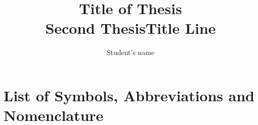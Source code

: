 \documentclass{ucalgthes1}
\title{Title of Thesis \\ \bigskip Second ThesisTitle Line }
\author{Student's name}
\begin{document}


\makethesistitle
{}     %
\setcounter{page}{1}

\newpage
{}
{}

\newpage
{}
{}


\begin{singlespace}
\newpage
{}
\tableofcontents
\pagestyle{plain}
\newpage
{}
\listoftables
\pagestyle{plain}
\newpage
{}
\listoffigures
\pagestyle{plain}
\clearpage
\clearpage          %
\end{singlespace}
\newpage
{}
\chapter*{\bf{List of Symbols, Abbreviations and Nomenclature}\hfill} 
\listofsymbols
\pagestyle{plain}
\clearpage






%
%
\def\newblock{\hskip .11em plus .33em minus .07em} %

\end{document}
